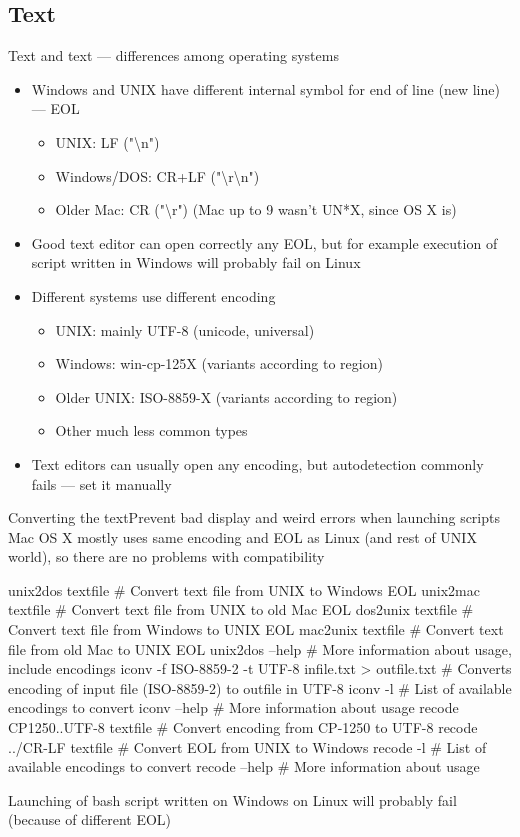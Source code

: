 \documentclass[compress, ucs, xelatex, 11pt, xcolor=svgnames,
  hyperref={
    bookmarks=true,
    unicode=true,
    colorlinks=true,
    pdftitle={Linux, command line and MetaCentrum},
    plainpages=false,
    pdfauthor={Vojtech Zeisek},
    pdfsubject={Course about use of Linux command line, writing shell scripts and using MetaCentrum of CESNET},
    pdfcreator={XeLaTeX, http://www.xelatex.org/},
    pdfkeywords={Linux, GNU, BASH, shell, command line, MetaCentrum},
    linkcolor=Sienna,
    anchorcolor=black,
    citecolor=green,
    filecolor=magenta,
    menucolor=Sienna,
    urlcolor=cyan,
    pdftex},
  url={hyphens, lowtilde} %
  ]{beamer}
\begin{document}
\subsection{Text}

\begin{frame}{Text and text --- differences among operating systems}
\begin{itemize}
  \item Windows and UNIX have different internal symbol for end of line (new line) --- EOL
  \begin{itemize}
    \item UNIX: LF ("\textbackslash n")
    \item Windows/DOS: CR+LF ("\textbackslash r\textbackslash n")
    \item Older Mac: CR ("\textbackslash r") (Mac up to 9 wasn't UN*X, since OS X is)
  \end{itemize}
  \item Good text editor can open correctly any EOL, but for example execution of script written in Windows will probably fail on Linux
  \item Different systems use different encoding
  \begin{itemize}
    \item UNIX: mainly UTF-8 (unicode, universal)
    \item Windows: win-cp-125X (variants according to region)
    \item Older UNIX: ISO-8859-X (variants according to region)
    \item Other much less common types
  \end{itemize}
  \item Text editors can usually open any encoding, but autodetection commonly fails --- set it manually
\end{itemize}
\end{frame}

\begin{frame}[fragile]{Converting the text}{Prevent bad display and weird errors when launching scripts}
  Mac OS X mostly uses same encoding and EOL as Linux (and rest of UNIX world), so there are no problems with compatibility
  \begin{bashcode}
    unix2dos textfile # Convert text file from UNIX to Windows EOL
    unix2mac textfile # Convert text file from UNIX to old Mac EOL
    dos2unix textfile # Convert text file from Windows to UNIX EOL
    mac2unix textfile # Convert text file from old Mac to UNIX EOL
    unix2dos --help # More information about usage, include encodings
    iconv -f ISO-8859-2 -t UTF-8 infile.txt > outfile.txt
      # Converts encoding of input file (ISO-8859-2) to outfile in UTF-8
    iconv -l # List of available encodings to convert
    iconv --help # More information about usage
    recode CP1250..UTF-8 textfile # Convert encoding from CP-1250 to UTF-8
    recode ../CR-LF textfile # Convert EOL from UNIX to Windows
    recode -l # List of available encodings to convert
    recode --help # More information about usage
  \end{bashcode}
  Launching of bash script written on Windows on Linux will probably fail (because of different EOL)
\end{frame}
\end{document}
